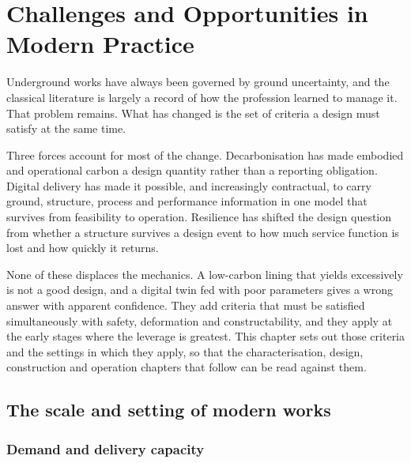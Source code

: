 %
\chapter{Challenges and Opportunities in Modern Practice}
\label{ch:challenges}

Underground works have always been governed by ground uncertainty, and the
classical literature is largely a record of how the profession learned to
manage it. That problem remains. What has changed is the set of
criteria a design must satisfy at the same time.

Three forces account for most of the change. Decarbonisation has made embodied
and operational carbon a design quantity rather than a reporting obligation.
Digital delivery has made it possible, and increasingly contractual, to
carry ground, structure, process and performance information in one model that
survives from feasibility to operation. Resilience has shifted the design
question from whether a structure survives a design event to how much service
function is lost and how quickly it returns.

None of these displaces the mechanics. A low-carbon lining that yields
excessively is not a good design, and a digital twin fed with poor parameters
gives a wrong answer with apparent confidence. They add criteria that
must be satisfied simultaneously with safety, deformation and
constructability, and they apply at the early stages where the leverage is
greatest. This chapter sets out those criteria and the settings in which they
apply, so that the characterisation, design, construction and operation
chapters that follow can be read against them.

\section{The scale and setting of modern works}
\label{sec:settings}

\subsection{Demand and delivery capacity}
\label{sec:demand-capacity}

